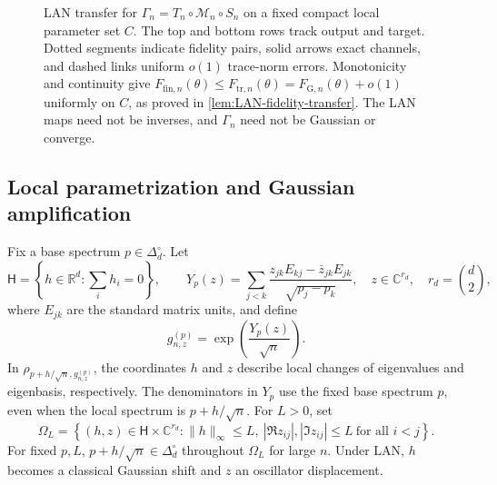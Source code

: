 \documentclass[11pt]{article}
\theoremstyle{remark}
\theoremstyle{plain}
\newcommand{\C}{\mathbb C}
\newcommand{\R}{\mathbb R}
\newcommand{\cM}{\mathcal M}
\begin{document}
\begin{figure}[!htbp]
\caption{LAN transfer for \(\Gamma_n=T_n\circ\cM_n\circ S_n\) on a fixed
  compact local parameter set \(C\).  The top and bottom rows track output
  and target. Dotted segments indicate fidelity pairs, solid arrows exact
  channels, and dashed links uniform \(o(1)\) trace-norm errors.
  Monotonicity and continuity give
  \(F_{\mathrm{fin},n}(\theta)\le F_{\mathrm{tr},n}(\theta)
    =F_{\mathrm G,n}(\theta)+o(1)\) uniformly on \(C\), as proved in
  \cref{lem:LAN-fidelity-transfer}.  The LAN maps
  need not be inverses, and \(\Gamma_n\) need not be Gaussian or converge.}
\label{fig:LAN-transfer}
\end{figure}

\subsection{Local parametrization and Gaussian amplification}
\label{sec:gaussian-amplification}

Fix a base spectrum \(p\in\Delta_d^\circ\).  Let
\[
  \mathsf H=\left\{h\in\R^d:\sum_i h_i=0\right\},
  \qquad
  Y_p(z)=\sum_{j<k}
    \frac{z_{jk}E_{kj}-\bar z_{jk}E_{jk}}{\sqrt{p_j-p_k}},
  \quad z\in\C^{r_d},\quad r_d=\binom d2,
\]
where \(E_{jk}\) are the standard matrix units, and define
\[
  g_{n,z}^{(p)}=\exp\!\left(\frac{Y_p(z)}{\sqrt n}\right).
\]
In \(\rho_{p+h/\sqrt n,g_{n,z}^{(p)}}\), the coordinates \(h\) and \(z\)
describe local changes of eigenvalues and eigenbasis, respectively.
The denominators in \(Y_p\) use the fixed base spectrum \(p\), even when the
local spectrum is \(p+h/\sqrt n\).  For \(L>0\), set
\[
  \Omega_L
  =\left\{(h,z)\in\mathsf H\times\C^{r_d}:
  \|h\|_\infty\le L,\
  |\Re z_{ij}|,|\Im z_{ij}|\le L\ \text{for all }i<j\right\}.
\]
For fixed \(p,L\), \(p+h/\sqrt n\in\Delta_d^\circ\) throughout
\(\Omega_L\) for large \(n\).  Under LAN, \(h\) becomes a classical Gaussian
shift and \(z\) an oscillator displacement.
\end{document}
